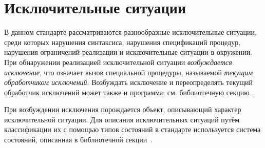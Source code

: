 \section{Исключительные ситуации}
\label{exceptionalsituationsection}

В данном стандарте рассматриваются разнообразные исключительные
ситуации, среди которых нарушения синтаксиса, нарушения спецификаций процедур, нарушения
ограничений реализации и исключительные ситуации в окружении. При обнаружении реализацией
исключительной ситуации \textit{возбуждается исключение}, что
означает вызов специальной процедуры, называемой \textit{текущим обработчиком исключений}.
Возбуждать исключение и переопределять текущий обработчик исключений может также и программа;
см. библиотечную секцию~.

При возбуждении исключения порождается объект, описывающий характер исключительной ситуации. Для
описания исключительных ситуаций путём классификации их с помощью типов состояний в стандарте
используется система состояний, описанная в библиотечной
секции~.

